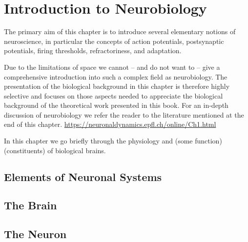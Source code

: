\chapter{Introduction to Neurobiology}\label{chap:neuro}

The primary aim of this chapter is to introduce several elementary notions of neuroscience, in particular the concepts of action potentials, postsynaptic potentials, firing thresholds, refractoriness, and adaptation.

Due to the limitations of space we cannot – and do not want to – give a comprehensive introduction into such a complex field as neurobiology. The presentation of the biological background in this chapter is therefore highly selective and focuses on those aspects needed to appreciate the biological background of the theoretical work presented in this book. For an in-depth discussion of neurobiology we refer the reader to the literature mentioned at the end of this chapter. \url{https://neuronaldynamics.epfl.ch/online/Ch1.html}

In this chapter we go briefly through the physiology and (some function)(constituents) of biological brains.

\section{Elements of Neuronal Systems}

\section{The Brain}



\section{The Neuron}



